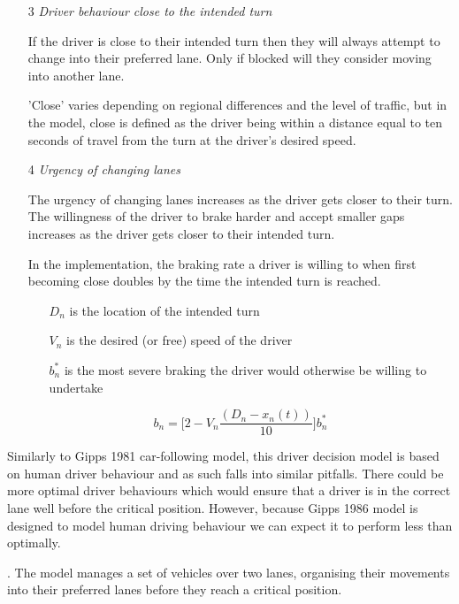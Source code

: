 \begin{enumerate}
\item[3] \textit{Driver behaviour close to the intended turn}

If the driver is close to their intended turn then they will always attempt to change into their preferred lane. Only if blocked will they consider moving into another lane. 

'Close' varies depending on regional differences and the level of traffic, but in the model, close is defined as the driver being within a distance equal to ten seconds of travel from the turn at the driver's desired speed.

\item[4] \textit{Urgency of changing lanes}

The urgency of changing lanes increases as the driver gets closer to their turn. The willingness of the driver to brake harder and accept smaller gaps increases as the driver gets closer to their intended turn.

In the implementation, the braking rate a driver is willing to when first becoming close doubles by the time the intended turn is reached. 

\begin{itemize}
\item[$D_n$] is the location of the intended turn
\item[$V_n$] is the desired (or free) speed of the driver
\item[$b_n^*$] is the most severe braking the driver would otherwise be willing to undertake
\end{itemize}

\begin{equation}
b_n = \Biggl[2 - V_n\frac{(D_n - x_n(t))}{10}\Biggr]b_n^*
\end{equation}

\end{enumerate}

Similarly to Gipps 1981 car-following model, this driver decision model is based on human driver behaviour and as such falls into similar pitfalls. There could be more optimal driver behaviours which would ensure that a driver is in the correct lane well before the critical position. However, because Gipps 1986 model is designed to model human driving behaviour we can expect it to perform less than optimally.

. The model manages a set of vehicles over two lanes, organising their movements into their preferred lanes before they reach a critical position.

